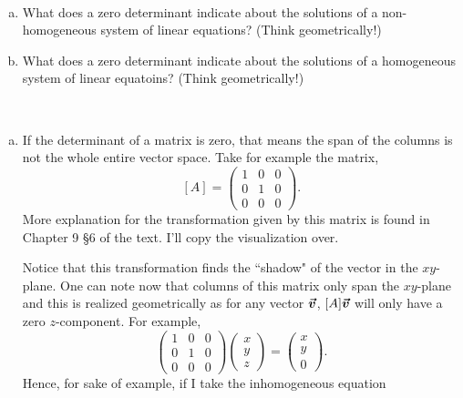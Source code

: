 \documentclass[12pt]{article} %
\begin{document}
\newpage
\begin{problem}~
\begin{enumerate}[(a)]
    \item What does a zero determinant indicate about the solutions of a non-homogeneous system of linear equations? (Think geometrically!)
    \item What does a zero determinant indicate about the solutions of a homogeneous system of linear equatoins? (Think geometrically!)
\end{enumerate}
\end{problem}
\begin{solution}~
\begin{enumerate}[(a)]

    \item If the determinant of a matrix is zero, that means the span of the columns is not the whole entire vector space.  Take for example the matrix,
\[
[A]=\begin{pmatrix} 1 & 0 & 0 \\ 0 & 1 & 0 \\ 0 & 0 & 0 \end{pmatrix}.
\]
More explanation for the transformation given by this matrix is found in Chapter 9 \S 6 of the text. I'll copy the visualization over.
        \begin{figure}[H]
            \centering
            \resizebox{.6\textwidth}{!}{}
        \end{figure}
Notice that this transformation finds the ``shadow" of the vector in the $xy$-plane. One can note now that columns of this matrix only span the $xy$-plane and this is realized geometrically as for any vector $\boldsymbol{\vec{v}}$, $[A]\boldsymbol{\vec{v}}$ will only have a zero $z$-component. For example,
\[
\begin{pmatrix} 1 & 0 & 0 \\ 0 & 1 & 0 \\ 0 & 0 & 0 \end{pmatrix} \begin{pmatrix} x \\ y \\ z \end{pmatrix} = \begin{pmatrix} x \\ y \\ 0 \end{pmatrix}.
\]
Hence, for sake of example, if I take the inhomogeneous equation

\end{enumerate}
\end{solution}
\end{document}
